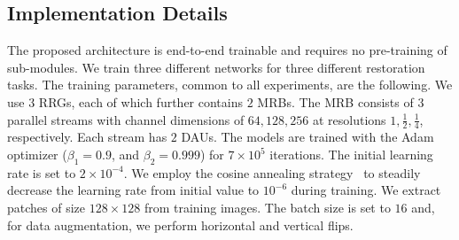\documentclass[runningheads]{llncs}
\begin{document}
\subsection{Implementation Details}
The proposed architecture is end-to-end trainable and requires no pre-training of sub-modules. 
We train three different networks for three different restoration tasks. The training parameters, common to all experiments, are the following. 
We use 3 RRGs, each of which further contains $2$ MRBs. The MRB consists of $3$ parallel streams with channel dimensions of $64, 128, 256$ at resolutions $1, \frac{1}{2}, \frac{1}{4}$, respectively. Each stream has $2$ DAUs.  
The models are trained with the Adam optimizer ($\beta_1 = 0.9$, and $\beta_2=0.999$) for $7\times10^5$ iterations. The initial learning rate is set to $2\times10^{-4}$. We employ the cosine annealing strategy~\cite{loshchilov2016sgdr} to steadily decrease the learning rate from initial value to $10^{-6}$ during training. 
We extract patches of size $128\times128$ from training images. The batch size is set to $16$ and, for data augmentation, we perform horizontal and vertical flips.  




\begin{table*}[t]
\begin{center}
\caption{\small Denoising comparisons on the SIDD dataset \cite{sidd}.}
\label{table:sidd}
\setlength{\tabcolsep}{2.5pt}
\end{center}\vspace{-2.5em}
\end{table*}
\end{document}
